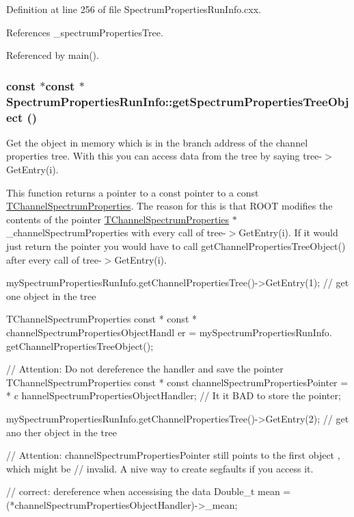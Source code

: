 Definition at line 256 of file SpectrumPropertiesRunInfo.cxx.

References \_\-spectrumPropertiesTree.

Referenced by main().\hypertarget{class_spectrum_properties_run_info_a13a12de80cf8fce594345616da473856}{
\subsubsection[{getSpectrumPropertiesTreeObject}]{ const $\ast$const $\ast$ SpectrumPropertiesRunInfo::getSpectrumPropertiesTreeObject ()}}
\label{class_spectrum_properties_run_info_a13a12de80cf8fce594345616da473856}


Get the object in memory which is in the branch address of the channel properties tree. With this you can access data from the tree by saying {\ttfamily tree-\/$>$GetEntry(i)}.

This function returns a pointer to a const pointer to a const \hyperlink{class_t_channel_spectrum_properties}{TChannelSpectrumProperties}. The reason for this is that ROOT modifies the contents of the pointer {\ttfamily \hyperlink{class_t_channel_spectrum_properties}{TChannelSpectrumProperties}} {\ttfamily $\ast$} {\ttfamily \_\-channelSpectrumProperties} with every call of {\ttfamily tree-\/$>$GetEntry(i)}. If it would just return the pointer you would have to call getChannelPropertiesTreeObject() after every call of {\ttfamily tree-\/$>$GetEntry(i)}. 
\begin{DoxyCode}
  mySpectrumPropertiesRunInfo.getChannelPropertiesTree()->GetEntry(1); // get one
       object in the tree

  TChannelSpectrumProperties const * const * channelSpectrumPropertiesObjectHandl
      er 
                                                   = mySpectrumPropertiesRunInfo.
      getChannelPropertiesTreeObject();

  // Attention: Do not dereference the handler and save the pointer
  TChannelSpectrumProperties const * const channelSpectrumPropertiesPointer = * c
      hannelSpectrumPropertiesObjectHandler; // It it BAD to store the pointer;
  
  mySpectrumPropertiesRunInfo.getChannelPropertiesTree()->GetEntry(2); // get ano
      ther object in the tree

  // Attention: channelSpectrumPropertiesPointer still points to the first object
      , which might be
  // invalid. A nive way to create segfaults if you access it.

  // correct: dereference when accessising the data
  Double_t mean = (*channelSpectrumPropertiesObjectHandler)->_mean;
\end{DoxyCode}
 

